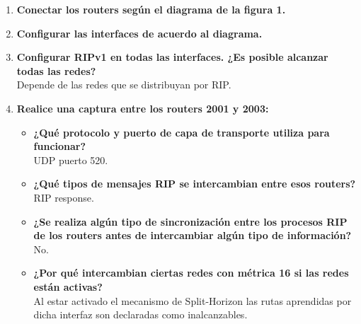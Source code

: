 \documentclass[letterpaper,12pt]{article}
\begin{document}
\begin{enumerate}
		\item \textbf{Conectar los routers según el diagrama de la figura 1.}
		\item \textbf{Configurar las interfaces de acuerdo al diagrama.}
		\item \textbf{Configurar RIPv1 en todas las interfaces. ¿Es posible alcanzar todas las redes?} \\
		Depende de las redes que se distribuyan por RIP. 
		
		\item \textbf{Realice una captura entre los routers 2001 y 2003:}
		\begin{itemize}
			\item \textbf{¿Qué protocolo y puerto de capa de transporte utiliza para funcionar?} \\
			UDP puerto 520.
			\item \textbf{¿Qué tipos de mensajes RIP se intercambian entre esos routers?} \\
			RIP response.
			\item \textbf{¿Se realiza algún tipo de sincronización entre los procesos RIP de los routers antes de intercambiar algún tipo de información?} \\
			No.
			\item \textbf{¿Por qué intercambian ciertas redes con métrica 16 si las redes están activas?} \\
			Al estar activado el mecanismo de Split-Horizon las rutas aprendidas por dicha interfaz son declaradas como inalcanzables.
		\end{itemize}
		

\end{enumerate}
\end{document}
